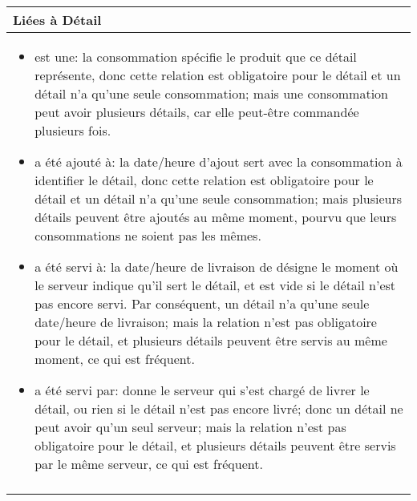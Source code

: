 \documentclass[a4paper,10pt]{article}
\begin{document}
\begin{tabu}{X}
\textbf{Liées à Détail}\\
\toprule

\begin{itemize}
    \item est une: la consommation spécifie le produit que ce détail représente, donc cette relation est obligatoire pour le détail et un détail n'a qu'une seule consommation; mais une consommation peut avoir plusieurs détails, car elle peut-être commandée plusieurs fois.
    \item a été ajouté à: la date/heure d'ajout sert avec la consommation à identifier le détail, donc cette relation est obligatoire pour le détail et un détail n'a qu'une seule consommation; mais plusieurs détails peuvent être ajoutés au même moment, pourvu que leurs consommations ne soient pas les mêmes.
    \item a été servi à: la date/heure de livraison de désigne le moment où le serveur indique qu'il sert le détail, et est vide si le détail n'est pas encore servi. Par conséquent, un détail n'a qu'une seule date/heure de livraison; mais la relation n'est pas obligatoire pour le détail, et plusieurs détails peuvent être servis au même moment, ce qui est fréquent.
    \item a été servi par: donne le serveur qui s'est chargé de livrer le détail, ou rien si le détail n'est pas encore livré; donc un détail ne peut avoir qu'un seul serveur; mais la relation n'est pas obligatoire pour le détail, et plusieurs détails peuvent être servis par le même serveur, ce qui est fréquent.
\end{itemize}
\\\\
\end{tabu}
\end{document}
